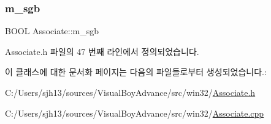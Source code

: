 \subsubsection{\texorpdfstring{m\+\_\+sgb}{m\_sgb}}
{\footnotesize\ttfamily B\+O\+OL Associate\+::m\+\_\+sgb}



Associate.\+h 파일의 47 번째 라인에서 정의되었습니다.



이 클래스에 대한 문서화 페이지는 다음의 파일들로부터 생성되었습니다.\+:\begin{DoxyCompactItemize}
\item 
C\+:/\+Users/sjh13/sources/\+Visual\+Boy\+Advance/src/win32/\mbox{\hyperlink{_associate_8h}{Associate.\+h}}\item 
C\+:/\+Users/sjh13/sources/\+Visual\+Boy\+Advance/src/win32/\mbox{\hyperlink{_associate_8cpp}{Associate.\+cpp}}\end{DoxyCompactItemize}

